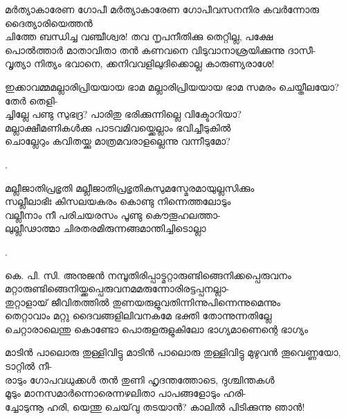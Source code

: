 \begin{enumerate}

\begin{slokam}{\VSr}{\ONN}{മർത്യാകാരേണ ഗോപീ}
മർത്യാകാരേണ ഗോപീവസനനിര കവർന്നോരു ദൈത്യാരിയെത്തൻ\\
ചിത്തേ ബന്ധിച്ച വഞ്ചീശ്വര! തവ നൃപനീതിക്കു തെറ്റില്ല, പക്ഷേ\\
പൊൽത്താർ മാതാവിതാ തൻ കണവനെ വിടുവാനാശ്രയിക്കുന്നു ദാസീ-\\
വൃത്യാ നിത്യം ഭവാനെ, ക്കനിവവളിലുദിക്കൊല്ല കാരുണ്യരാശേ!
\end{slokam}




\begin{slokam}{\VSv}{ഇക്കാവമ്മ}{മല്ലാരിപ്രിയയായ ഭാമ}
മല്ലാരിപ്രിയയായ ഭാമ സമരം ചെയ്തീലയോ? തേർ തെളി-\\
ച്ചില്ലേ പണ്ടു സുഭദ്ര? പാരിതു ഭരിക്കുന്നില്ലെ വിക്ടോറിയാ?\\
മല്ലാക്ഷീമണികള്‍ക്കു പാടവമിവയ്ക്കെല്ലാം ഭവിച്ചീടുകിൽ\\
ചൊല്ലേറും കവിതയ്ക്കു മാത്രമവരാളല്ലെന്നു വന്നീടുമോ?
\end{slokam}


.


\begin{slokam}{\VMk}{\KV}{മല്ലീജാതിപ്രഭൃതി}
മല്ലീജാതിപ്രഭൃതികുസുമസ്മേരമായുല്ലസിക്കും\\
സല്ലീലാഭിഃ ‍കിസലയകരം കൊണ്ടു നിന്നെത്തലോടും\\
വല്ലീനാം നീ പരിചയരസം പൂണ്ടു കൌതൂഹലത്താ-\\
ലുല്ലീഢാത്മാ ചിരതരമിരുന്നങ്ങമാന്തിച്ചിടൊല്ലാ
\end{slokam}


.



\begin{slokam}{\VSr}{കെ. പി. സി. അനുജൻ നമ്പൂതിരിപ്പാട്}{മറ്റാരുണ്ടിങ്ങെനിക്കപ്പെരുവനം}
മറ്റാരുണ്ടിങ്ങെനിയ്ക്കപ്പെരുവനമമരുന്നോരിരട്ടപ്പനല്ലാ-\\
തുറ്റാളായ് ജീവിതത്തിൽ തുണയരുളുവതിന്നിന്നുപിന്നെന്നുമെന്നും\\
തെറ്റാവാം മറ്റു ദൈവങ്ങളിലിവനകമേ ഭക്തി തോന്നുന്നതില്ലേ\\
ചെറ്റാരാലെന്തു കൊണ്ടോ പൊരുളരുളുകിലോ ഭാഗ്യമാണെന്റെ ഭാഗ്യം
\end{slokam}


\begin{slokam}{\VSv}{\UN}{മാടിൻ പാലൊരു തുള്ളിവിട്ടു}
 മാടിൻ പാലൊരു തുള്ളിവിട്ടു മുഴുവൻ തൂവെണ്ണയോ, ടാറ്റിൽ നീ-\\
രാടും ഗോപവധുക്കള്‍ തൻ തുണി ഹൃദന്തത്തോടെ, ദുശ്ചിന്തകള്‍\\
മൂടും മാനസമാർന്നൊരെന്നഴലിതാ പാപങ്ങളോടും ഹരി-\\
ച്ചോടുന്നൂ ഹരി, യെന്തു ചെയ്‌വു തടയാൻ? കാലിൽ പിടിക്കുന്നു ഞാൻ!
\end{slokam}


\end{enumerate}

